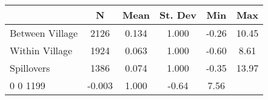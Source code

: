 \begin{tabular}{l*{5}{c}}\hline&\multicolumn{1}{c}{N}&\multicolumn{1}{c}{Mean}&\multicolumn{1}{c}{St. Dev}&\multicolumn{1}{c}{Min}&\multicolumn{1}{c}{Max}\\ \hline 
Between Village & 2126 & 0.134 & 1.000 & -0.26 & 10.45 \\
Within Village & 1924 & 0.063 & 1.000 & -0.60 & 8.61 \\
Spillovers & 1386 & 0.074 & 1.000 & -0.35 & 13.97 \\
0 0 1199 & -0.003 & 1.000 & -0.64 & 7.56 \\
\hline \end{tabular}
